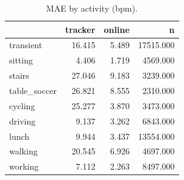 \begin{table}
\caption{MAE by activity (bpm).}
\label{tab:ppg_by_activity}
\begin{tabular}{lrrr}
\toprule
 & tracker & online & n \\
\midrule
transient & 16.415 & 5.489 & 17515.000 \\
sitting & 4.406 & 1.719 & 4569.000 \\
stairs & 27.046 & 9.183 & 3239.000 \\
table_soccer & 26.821 & 8.555 & 2310.000 \\
cycling & 25.277 & 3.870 & 3473.000 \\
driving & 9.137 & 3.262 & 6843.000 \\
lunch & 9.944 & 3.437 & 13554.000 \\
walking & 20.545 & 6.926 & 4697.000 \\
working & 7.112 & 2.263 & 8497.000 \\
\bottomrule
\end{tabular}
\end{table}
